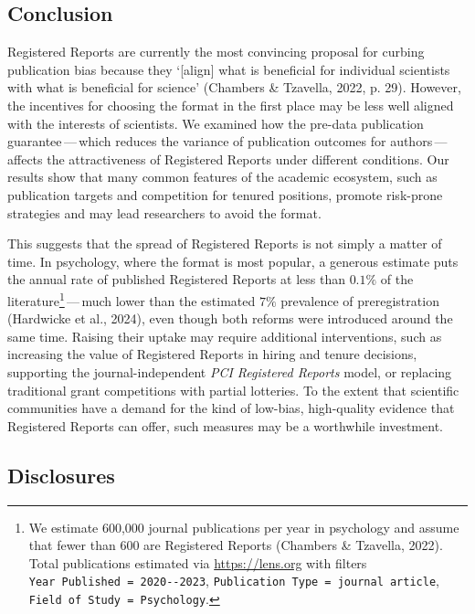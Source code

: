 \documentclass[
  british,
  a4paper,
  ,man,mask,floatsintext]{apa6}
\begin{document}
\subsection{Conclusion}\label{conclusion}

Registered Reports are currently the most convincing proposal for curbing publication bias because they `{[}align{]} what is beneficial for individual scientists with what is beneficial for science' (Chambers \& Tzavella, 2022, p. 29).
However, the incentives for choosing the format in the first place may be less well aligned with the interests of scientists.
We examined how the pre-data publication guarantee\(\,\)---\(\,\)which reduces the variance of publication outcomes for authors\(\,\)---\(\,\)affects the attractiveness of Registered Reports under different conditions.
Our results show that many common features of the academic ecosystem, such as publication targets and competition for tenured positions, promote risk-prone strategies and may lead researchers to avoid the format.

This suggests that the spread of Registered Reports is not simply a matter of time.
In psychology, where the format is most popular, a generous estimate puts the annual rate of published Registered Reports at less than \(0.1\%\) of the literature\footnote{We estimate 600,000 journal publications per year in psychology and assume that fewer than 600 are Registered Reports (Chambers \& Tzavella, 2022). Total publications estimated via \url{https://lens.org} with filters \texttt{Year\ Published\ =\ 2020-\/-2023}, \texttt{Publication\ Type\ =\ journal\ article}, \texttt{Field\ of\ Study\ =\ Psychology}.}\(\,\)---\(\,\)much lower than the estimated \(7\%\) prevalence of preregistration (Hardwicke et al., 2024), even though both reforms were introduced around the same time.
Raising their uptake may require additional interventions, such as increasing the value of Registered Reports in hiring and tenure decisions, supporting the journal-independent \emph{PCI Registered Reports} model, or replacing traditional grant competitions with partial lotteries.
To the extent that scientific communities have a demand for the kind of low-bias, high-quality evidence that Registered Reports can offer, such measures may be a worthwhile investment.

\subsection{Disclosures}\label{disclosures}
\end{document}
